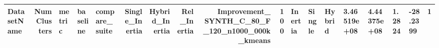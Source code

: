 \begin{tabular}{lrlllrrrrr}
\toprule
DatasetName & NumClusters & metric & baseline & compare_suite & Single_Inertia & Hybrid_Inertia & Rel_Inertia & Improvement_%
\midrule
SYNTH_C_80_F_120_n1000_000k_kmeans & 100 & Inertia & Single & Hybrid & 3.46519e+08 & 4.44375e+08 & 1.2824 & -28.2399 & 1 \\
\bottomrule
\end{tabular}
